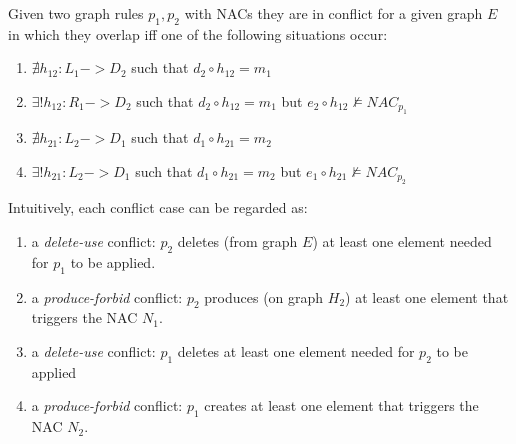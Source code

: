 \begin{definition}[Conflict]\label{def:classic-conflict} Given two graph rules $p_1, p_2$ with NACs they are in conflict for a given graph $E$ in which they overlap iff one of the following situations occur:

\begin{enumerate}
    \item $\nexists h_{12} : L_1 -> D_2$ such that $d_2 \circ h_{12} = m_1$
    \item $\exists! h_{12} : R_1 -> D_2$ such that $d_2 \circ h_{12} = m_1$ but $e_2 \circ h_{12} \not\models NAC_{p_1}$
    \item $\nexists h_{21} : L_2 -> D_1$ such that $d_1 \circ h_{21} = m_2$
    \item $\exists! h_{21} : L_2 -> D_1$ such that $d_1 \circ h_{21} = m_2$ but $e_1 \circ h_{21} \not\models NAC_{p_2}$
  \end{enumerate}

\end{definition}

Intuitively, each conflict case can be regarded as:

\begin{enumerate}
  \item a \emph{delete-use} conflict: $p_2$ deletes (from graph $E$) at least one element needed for $p_1$ to be applied.
  \item a \emph{produce-forbid} conflict: $p_2$ produces (on graph $H_2$) at least one element that triggers the NAC $N_1$.
  \item a \emph{delete-use} conflict: $p_1$ deletes at least one element needed for $p_2$ to be applied
  \item a \emph{produce-forbid} conflict: $p_1$ creates at least one element that triggers the NAC $N_2$.
\end{enumerate}

